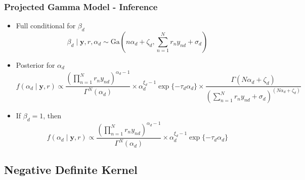 \documentclass[aspectratio=169,10pt,notes]{beamer}
\begin{document}
\begin{frame}
  \frametitle{Projected Gamma Model - Inference}
  \label{pgpareto:pginference}
  \begin{itemize}
    \item Full conditional for $\beta_d$
      \begin{equation*}
        \beta_d\mid \bm{ y}, r, \alpha_d \sim \text{Ga}\left(n\alpha_d + \zeta_d,
                {\textstyle \sum}_{n = 1}^Nr_ny_{nd} + \sigma_d\right)
      \end{equation*}
    \item Posterior for $\alpha_d$
      \begin{equation*}
        f(\alpha_d \mid \bm{ y}, r) \propto
          \frac{\left({\textstyle \prod}_{n = 1}^Nr_ny_{nd}\right)^{\alpha_d - 1}}{
            \Gamma^N(\alpha_d)} \times \alpha_d^{\xi_d - 1}\exp\{-\tau_d\alpha_d\} \times
            \frac{\Gamma(N\alpha_d + \zeta_d)}{
            \left({\textstyle\sum}_{n = 1}^N r_ny_{nd} + \sigma_d
                  \right)^{(N\alpha_d + \zeta_d)}}
      \end{equation*}
    \item If $\beta_d = 1$, then
    \begin{equation*}
      f(\alpha_d \mid \bm{ y}, r) \propto
        \frac{\left({\textstyle\prod}_{n = 1}^N r_ny_{nd}\right)^{\alpha_d - 1}}{\Gamma^N(\alpha_d)} \times
        \alpha_d^{\xi_d - 1}\exp\{-\tau_d\alpha_d\}
    \end{equation*}
  \end{itemize}
  \hyperlink{pgpareto:angulardatamodel}{}
\end{frame}

\subsection*{Negative Definite Kernel}
\end{document}

